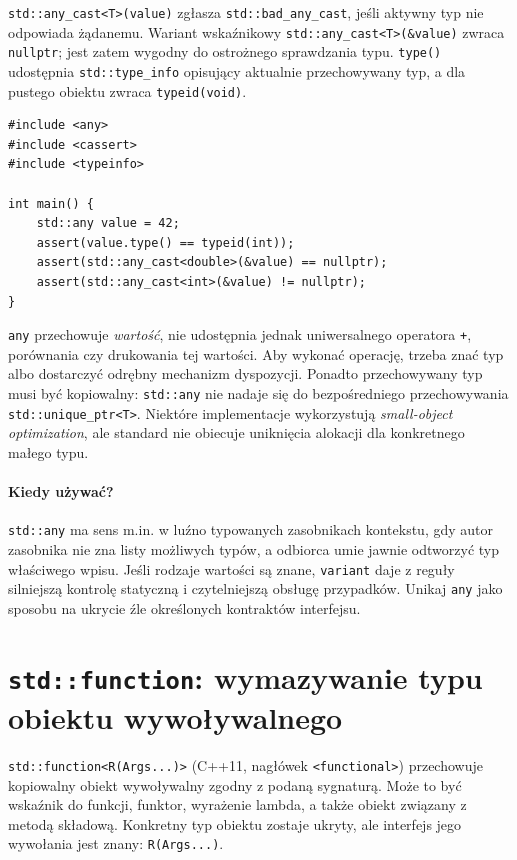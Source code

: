\texttt{std::any\_cast<T>(value)} zgłasza \texttt{std::bad\_any\_cast},
jeśli aktywny typ nie odpowiada żądanemu. Wariant wskaźnikowy
\texttt{std::any\_cast<T>(\&value)} zwraca \texttt{nullptr}; jest zatem
wygodny do ostrożnego sprawdzania typu. \texttt{type()} udostępnia
\texttt{std::type\_info} opisujący aktualnie przechowywany typ,
a dla pustego obiektu zwraca \texttt{typeid(void)}.

\begin{lstlisting}[caption={\texttt{any\_cast} nie jest konwersją numeryczną; kompletny program.}]
#include <any>
#include <cassert>
#include <typeinfo>

int main() {
    std::any value = 42;
    assert(value.type() == typeid(int));
    assert(std::any_cast<double>(&value) == nullptr);
    assert(std::any_cast<int>(&value) != nullptr);
}
\end{lstlisting}

\texttt{any} przechowuje \emph{wartość}, nie udostępnia jednak uniwersalnego
operatora \texttt{+}, porównania czy drukowania tej wartości. Aby wykonać
operację, trzeba znać typ albo dostarczyć odrębny mechanizm dyspozycji.
Ponadto przechowywany typ musi być kopiowalny: \texttt{std::any}
nie nadaje się do bezpośredniego przechowywania \texttt{std::unique\_ptr<T>}.
Niektóre implementacje wykorzystują \emph{small-object optimization},
ale standard nie obiecuje uniknięcia alokacji dla konkretnego małego typu.

\paragraph{Kiedy używać?}
\texttt{std::any} ma sens m.in. w luźno typowanych zasobnikach kontekstu,
gdy autor zasobnika nie zna listy możliwych typów, a odbiorca umie
jawnie odtworzyć typ właściwego wpisu. Jeśli rodzaje wartości są znane,
\texttt{variant} daje z reguły silniejszą kontrolę statyczną i czytelniejszą
obsługę przypadków. Unikaj \texttt{any} jako sposobu na ukrycie
źle określonych kontraktów interfejsu.

\section{\texttt{std::function}: wymazywanie typu obiektu wywoływalnego}
\label{sec:cpp14-function}

\texttt{std::function<R(Args...)>} (C++11, nagłówek
\texttt{<functional>}) przechowuje kopiowalny obiekt wywoływalny zgodny
z podaną sygnaturą. Może to być wskaźnik do funkcji, funktor,
wyrażenie lambda, a także obiekt związany z metodą składową. Konkretny
typ obiektu zostaje ukryty, ale interfejs jego wywołania jest znany:
\texttt{R(Args...)}.

